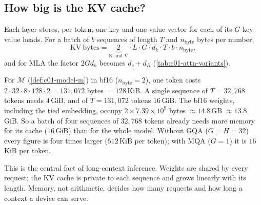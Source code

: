 \subsection{How big is the KV cache?}\label{sec:c01-kv-size}

Each layer stores, per token, one key and one value vector for each of its $G$ key--value
heads. For a batch of $b$ sequences of length $T$ and $n_{\mathrm{byte}}$ bytes per number,
\begin{equation}\label{eq:c01-kv-bytes}
  \mathrm{KV\ bytes} = \underbrace{2}_{\text{K and V}} \cdot L \cdot G \cdot d_k \cdot T \cdot b \cdot n_{\mathrm{byte}},
\end{equation}
and for MLA the factor $2Gd_k$ becomes $d_c + d_R$ (\cref{tab:c01-attn-variants}).

\begin{example}\label{ex:c01-kv-size}
For $\mathcal{M}$ (\cref{def:c01-model-m}) in bf16 ($n_{\mathrm{byte}} = 2$), one token
costs $2\cdot 32\cdot 8\cdot 128\cdot 2 = 131{,}072$ bytes $= 128$\,KiB. A single sequence of
$T = 32{,}768$ tokens needs $4$\,GiB, and of $T = 131{,}072$ tokens $16$\,GiB. The bf16
weights, including the tied embedding, occupy $2 \times 7.39\times 10^9$ bytes
$\approx 14.8$\,GB $\approx 13.8$\,GiB. So a batch of four sequences of $32{,}768$ tokens
already needs more memory for its cache ($16$\,GiB) than for the whole model. Without GQA ($G = H = 32$) every figure is four times larger ($512$\,KiB per token);
with MQA ($G = 1$) it is $16$\,KiB per token.
\end{example}

This is the central fact of long-context inference. Weights are shared by every request; the
KV cache is private to each sequence and grows linearly with its length. Memory, not
arithmetic, decides how many requests and how long a context a device can serve.

